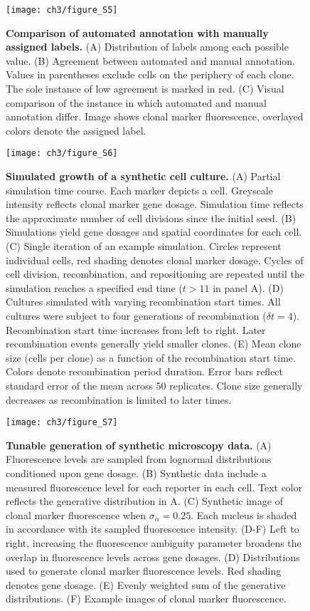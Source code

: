 \begin{figure}[h]
\texttt{[image: ch3/figure\_S5]}
\caption[Comparison of automated annotation with manually assigned labels.]{\textbf{Comparison of automated annotation with manually assigned labels.} (A) Distribution of labels among each possible value. (B) Agreement between automated and manual annotation. Values in parentheses exclude cells on the periphery of each clone. The sole instance of low agreement is marked in red. (C) Visual comparison of the instance in which automated and manual annotation differ. Image shows clonal marker fluorescence, overlayed colors denote the assigned label.}
\label{fig:ch3:figS5}
\end{figure}

\begin{figure}[h]
\texttt{[image: ch3/figure\_S6]}
\caption[Simulated growth of a synthetic cell culture.]{\textbf{Simulated growth of a synthetic cell culture.} (A) Partial simulation time course. Each marker depicts a cell. Greyscale intensity reflects clonal marker gene dosage. Simulation time reflects the approximate number of cell divisions since the initial seed. (B) Simulations yield gene dosages and spatial coordinates for each cell. (C) Single iteration of an example simulation. Circles represent individual cells, red shading denotes clonal marker dosage. Cycles of cell division, recombination, and repositioning are repeated until the simulation reaches a specified end time ($t>11$ in panel A). (D) Cultures simulated with varying recombination start times. All cultures were subject to four generations of recombination ($\delta t=4$). Recombination start time increases from left to right. Later recombination events generally yield smaller clones. (E) Mean clone size (cells per clone) as a function of the recombination start time. Colors denote recombination period duration. Error bars reflect standard error of the mean across 50 replicates. Clone size generally decreases as recombination is limited to later times.}
\label{fig:ch3:figS6}
\end{figure}

\begin{figure}[h]
\texttt{[image: ch3/figure\_S7]}
\caption[Tunable generation of synthetic microscopy data.]{\textbf{Tunable generation of synthetic microscopy data.} (A) Fluorescence levels are sampled from lognormal distributions conditioned upon gene dosage. (B) Synthetic data include a measured fluorescence level for each reporter in each cell. Text color reflects the generative distribution in A. (C) Synthetic image of clonal marker fluorescence when $\sigma_{\alpha}=0.25$. Each nucleus is shaded in accordance with its sampled fluorescence intensity. (D-F) Left to right, increasing the fluorescence ambiguity parameter broadens the overlap in fluorescence levels across gene dosages. (D) Distributions used to generate clonal marker fluorescence levels. Red shading denotes gene dosage. (E) Evenly weighted sum of the generative distributions. (F) Example images of clonal marker fluorescence.}
\label{fig:ch3:figS7}
\end{figure}

